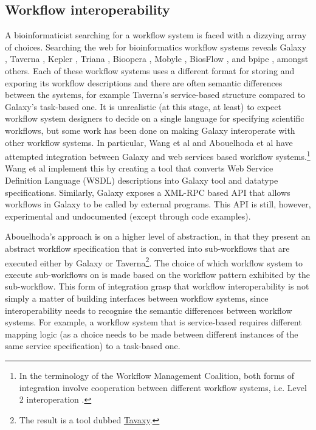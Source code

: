 \documentclass[a4paper,10pt]{scrreprt} \usepackage[utf8]{inputenc}
\begin{document}
\subsection{Workflow interoperability}

A bioinformaticist searching for a workflow system is faced with a dizzying array of choices. Searching 
the web for bioinformatics workflow systems reveals Galaxy \cite{giardine_galaxy:_2005}, Taverna \cite{oinn_taverna:_2004}, Kepler \cite{altintas_kepler:_2004}, Triana \cite{churches_programming_2006}, Bioopera \cite{bausch_bioopera:_2002}, Mobyle \cite{neron_mobyle:_2009}, BiosFlow \cite{xu_biosflow_2009}, \cite{orvis_ergatis:_2010} and bpipe \cite{sadedin_bpipe:_2012}, amongst others. Each of these workflow systems uses a different format for storing and exporing its workflow descriptions and there are often semantic differences between the systems, for example Taverna's service-based structure compared to Galaxy's task-based one. It is unrealistic (at this stage, at least) to expect workflow system designers to decide on a single language for specifying scientific workflows, but some work has been done on making Galaxy interoperate with other workflow systems. 
In particular, Wang et al \cite{wang_adapting_2009} and Abouelhoda et al \cite{abouelhoda_meta-workflows:_2010} have attempted integration between Galaxy and web services based workflow systems.\footnote{In the terminology of the Workflow Management Coalition, both forms of integration involve cooperation between different workflow systems, i.e. Level 2 interoperation \cite{workflow_management_coalition_workflow_1999}.} Wang et al implement this by creating a tool that converts Web Service Definition Language (WSDL) descriptions into Galaxy tool and datatype specifications. Similarly, Galaxy exposes a XML-RPC based API that allows workflows in Galaxy to be called by external programs. This API is still, however, experimental and undocumented (except through code examples).

Abouelhoda's approach is on a higher level of abstraction, in that they present an abstract workflow specification that is converted into sub-workflows that are executed either by Galaxy or Taverna\footnote{The result is a tool dubbed \href{http://www.tavaxy.org/}{Tavaxy}.}. The choice of which workflow system to execute sub-workflows on is made based on the workflow pattern exhibited by the sub-workflow. This form of integration grasp that workflow interoperability is not simply a matter of building interfaces between workflow systems, since interoperability needs to recognise the semantic differences between workflow systems. For example, a workflow system that is service-based requires different mapping logic (as a choice needs to be made between different instances of the same service specification) to a task-based one.
\end{document}
